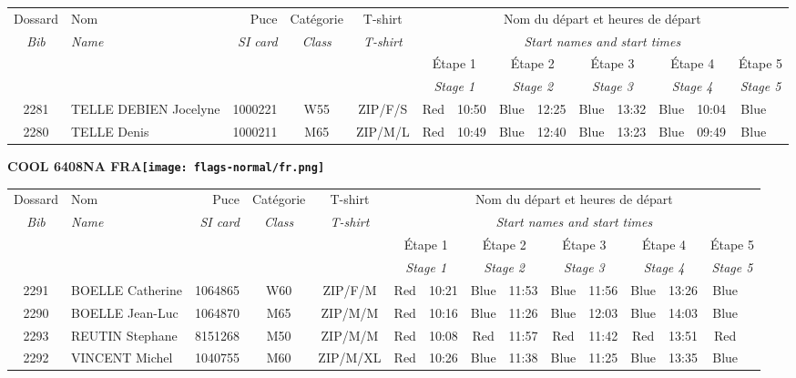 \documentclass{report}
\begin{document}
  \begin{longtable}{|c|l|r|c|c|*{5}{cc|}}
    Dossard & Nom  & Puce    & Catégorie & T-shirt & \multicolumn{10}{c|}{Nom du départ et heures de départ} \\
    \itshape Bib     & \itshape Name & \itshape SI card & \itshape Class  & \itshape  T-shirt  & \multicolumn{10}{c|}{\itshape Start names and start times} \\
    \hline
    & & & & & \multicolumn{2}{c|}{Étape 1} & \multicolumn{2}{c|}{Étape 2} & \multicolumn{2}{c|}{Étape 3} & \multicolumn{2}{c|}{Étape 4} & \multicolumn{2}{c|}{Étape 5} \\
    & & & & & \multicolumn{2}{c|}{\itshape Stage 1} & \multicolumn{2}{c|}{\itshape Stage 2} & \multicolumn{2}{c|}{\itshape Stage 3} & \multicolumn{2}{c|}{\itshape Stage 4} & \multicolumn{2}{c|}{\itshape Stage 5} \\
    \hline
    2281 & TELLE DEBIEN Jocelyne & 1000221 & W55 & ZIP/F/S & Red & 10:50 & Blue & 12:25 & Blue & 13:32 & Blue & 10:04 & Blue &  \\
    2280 & TELLE Denis & 1000211 & M65 & ZIP/M/L & Red & 10:49 & Blue & 12:40 & Blue & 13:23 & Blue & 09:49 & Blue &  \\
  \end{longtable}
\newpage
  \Huge \centering \bfseries COOL 6408NA FRA\normalfont \footnotesize \sffamily \hfill \texttt{[image: flags-normal/fr.png]} \newline 
  \begin{longtable}{|c|l|r|c|c|*{5}{cc|}}
    Dossard & Nom  & Puce    & Catégorie & T-shirt & \multicolumn{10}{c|}{Nom du départ et heures de départ} \\
    \itshape Bib     & \itshape Name & \itshape SI card & \itshape Class  & \itshape  T-shirt  & \multicolumn{10}{c|}{\itshape Start names and start times} \\
    \hline
    & & & & & \multicolumn{2}{c|}{Étape 1} & \multicolumn{2}{c|}{Étape 2} & \multicolumn{2}{c|}{Étape 3} & \multicolumn{2}{c|}{Étape 4} & \multicolumn{2}{c|}{Étape 5} \\
    & & & & & \multicolumn{2}{c|}{\itshape Stage 1} & \multicolumn{2}{c|}{\itshape Stage 2} & \multicolumn{2}{c|}{\itshape Stage 3} & \multicolumn{2}{c|}{\itshape Stage 4} & \multicolumn{2}{c|}{\itshape Stage 5} \\
    \hline
    2291 & BOELLE Catherine & 1064865 & W60 & ZIP/F/M & Red & 10:21 & Blue & 11:53 & Blue & 11:56 & Blue & 13:26 & Blue &  \\
    2290 & BOELLE Jean-Luc & 1064870 & M65 & ZIP/M/M & Red & 10:16 & Blue & 11:26 & Blue & 12:03 & Blue & 14:03 & Blue &  \\
    2293 & REUTIN Stephane & 8151268 & M50 & ZIP/M/M & Red & 10:08 & Red & 11:57 & Red & 11:42 & Red & 13:51 & Red &  \\
    2292 & VINCENT Michel & 1040755 & M60 & ZIP/M/XL & Red & 10:26 & Blue & 11:38 & Blue & 11:25 & Blue & 13:35 & Blue &  \\
  \end{longtable}
\end{document}
